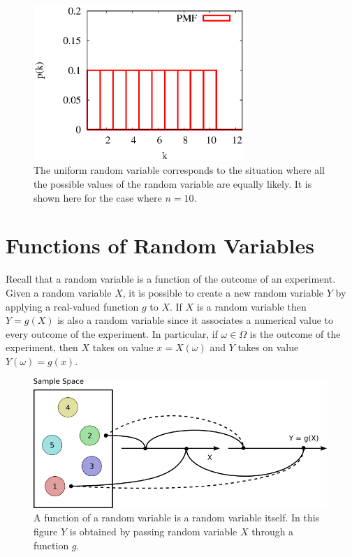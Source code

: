 \begin{figure}[ht]
\begin{center}
\includegraphics[width=8cm]{Figures/5chapter/uniform}
\end{center}
\caption{The uniform random variable corresponds to the situation where all the possible values of the random variable are equally likely.
It is shown here for the case where $n = 10$.}
\end{figure}

\section{Functions of Random Variables}
\label{subsection:FunctionDiscreteRV}
Recall that a random variable is a function of the outcome of an experiment.
Given a random variable $X$, it is possible to create a new random variable $Y$ by applying a real-valued function $g$ to $X$.
If $X$ is a random variable then $Y = g(X)$ is also a random variable since it associates a numerical value to every outcome of the experiment.
In particular, if $\omega \in \Omega$ is the outcome of the experiment, then $X$ takes on value $x = X(\omega)$ and $Y$ takes on value $Y(\omega) = g(x)$.

\begin{figure}[ht]
\begin{center}
\includegraphics[height=4.93cm]{Figures/5Chapter/fcn}
\caption{A function of a random variable is a random variable itself.
In this figure $Y$ is obtained by passing random variable $X$ through a function $g$.}
\end{center}
\end{figure}

